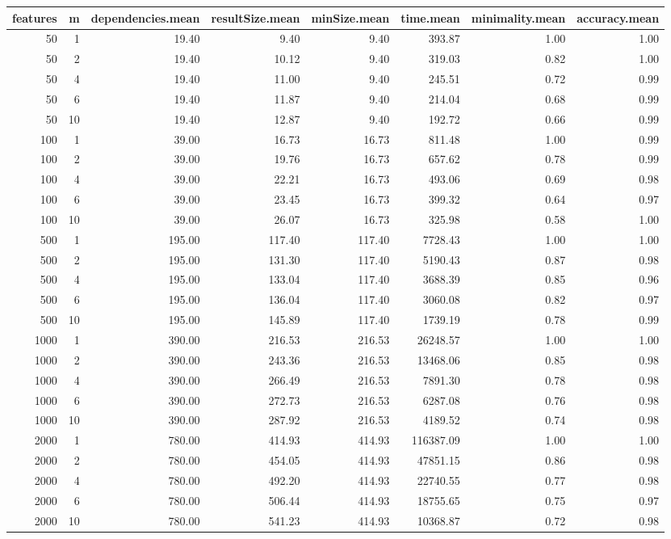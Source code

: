 \begin{table}[ht]
\centering
\begin{tabular}{rrrrrrrr}
  \hline
features & m & dependencies.mean & resultSize.mean & minSize.mean & time.mean & minimality.mean & accuracy.mean \\ 
  \hline
 50 &   1 & 19.40 & 9.40 & 9.40 & 393.87 & 1.00 & 1.00 \\ 
   50 &   2 & 19.40 & 10.12 & 9.40 & 319.03 & 0.82 & 1.00 \\ 
   50 &   4 & 19.40 & 11.00 & 9.40 & 245.51 & 0.72 & 0.99 \\ 
   50 &   6 & 19.40 & 11.87 & 9.40 & 214.04 & 0.68 & 0.99 \\ 
   50 &  10 & 19.40 & 12.87 & 9.40 & 192.72 & 0.66 & 0.99 \\ 
  100 &   1 & 39.00 & 16.73 & 16.73 & 811.48 & 1.00 & 0.99 \\ 
  100 &   2 & 39.00 & 19.76 & 16.73 & 657.62 & 0.78 & 0.99 \\ 
  100 &   4 & 39.00 & 22.21 & 16.73 & 493.06 & 0.69 & 0.98 \\ 
  100 &   6 & 39.00 & 23.45 & 16.73 & 399.32 & 0.64 & 0.97 \\ 
  100 &  10 & 39.00 & 26.07 & 16.73 & 325.98 & 0.58 & 1.00 \\ 
  500 &   1 & 195.00 & 117.40 & 117.40 & 7728.43 & 1.00 & 1.00 \\ 
  500 &   2 & 195.00 & 131.30 & 117.40 & 5190.43 & 0.87 & 0.98 \\ 
  500 &   4 & 195.00 & 133.04 & 117.40 & 3688.39 & 0.85 & 0.96 \\ 
  500 &   6 & 195.00 & 136.04 & 117.40 & 3060.08 & 0.82 & 0.97 \\ 
  500 &  10 & 195.00 & 145.89 & 117.40 & 1739.19 & 0.78 & 0.99 \\ 
  1000 &   1 & 390.00 & 216.53 & 216.53 & 26248.57 & 1.00 & 1.00 \\ 
  1000 &   2 & 390.00 & 243.36 & 216.53 & 13468.06 & 0.85 & 0.98 \\ 
  1000 &   4 & 390.00 & 266.49 & 216.53 & 7891.30 & 0.78 & 0.98 \\ 
  1000 &   6 & 390.00 & 272.73 & 216.53 & 6287.08 & 0.76 & 0.98 \\ 
  1000 &  10 & 390.00 & 287.92 & 216.53 & 4189.52 & 0.74 & 0.98 \\ 
  2000 &   1 & 780.00 & 414.93 & 414.93 & 116387.09 & 1.00 & 1.00 \\ 
  2000 &   2 & 780.00 & 454.05 & 414.93 & 47851.15 & 0.86 & 0.98 \\ 
  2000 &   4 & 780.00 & 492.20 & 414.93 & 22740.55 & 0.77 & 0.98 \\ 
  2000 &   6 & 780.00 & 506.44 & 414.93 & 18755.65 & 0.75 & 0.97 \\ 
  2000 &  10 & 780.00 & 541.23 & 414.93 & 10368.87 & 0.72 & 0.98 \\ 
   \hline
\end{tabular}
\end{table}
